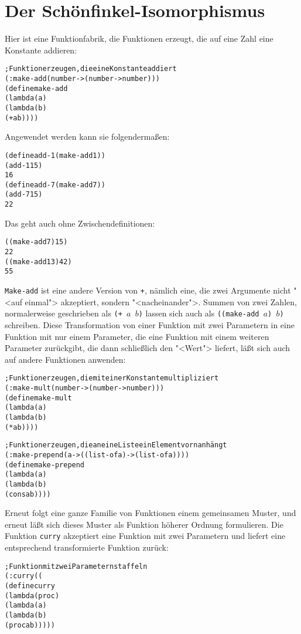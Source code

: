 \section{Der Schönfinkel-Isomorphismus}
\label{sec:currying}
Hier ist eine Funktionfabrik, die Funktionen erzeugt, die auf eine
Zahl eine Konstante addieren:
%
\begin{alltt}
; Funktion erzeugen, die eine Konstante addiert
(: make-add (number -> (number -> number)))
(define make-add
  (lambda (a)
    (lambda (b)
      (+ a b))))
\end{alltt}
%
Angewendet werden kann sie folgendermaßen:
%
\begin{alltt}
(define add-1 (make-add 1))
(add-1 15)
\evalsto{} 16
(define add-7 (make-add 7))
(add-7 15)
\evalsto{} 22
\end{alltt}
%
Das geht auch ohne Zwischendefinitionen:
%
\begin{alltt}
((make-add 7) 15)
\evalsto{} 22
((make-add 13) 42)
\evalsto{} 55
\end{alltt}
%
\texttt{Make-add} ist eine andere Version von \texttt{+}, nämlich
eine, die zwei Argumente nicht "<auf einmal"> akzeptiert, sondern
"<nacheinander">.  Summen von zwei Zahlen, normalerweise geschrieben
als \texttt{(+ $a$ $b$)} lassen sich auch als \texttt{((make-add $a$)
  $b$)} schreiben.  Diese Transformation von einer Funktion mit zwei
Parametern in eine Funktion mit nur einem Parameter, die eine Funktion
mit einem weiteren Parameter zurückgibt, die dann schließlich den "<Wert">
liefert, läßt sich auch auf andere Funktionen anwenden:
%
\begin{alltt}
; Funktion erzeugen, die mit einer Konstante multipliziert
(: make-mult (number -> (number -> number)))
(define make-mult
  (lambda (a)
    (lambda (b)
      (* a b))))

; Funktion erzeugen, die an eine Liste ein Element vorn anhängt
(: make-prepend (a -> ((list-of a) -> (list-of a))))
(define make-prepend
  (lambda (a)
    (lambda (b)
      (cons a b))))
\end{alltt}
%
Erneut folgt eine ganze Familie von Funktionen einem gemeinsamen
Muster, und erneut läßt sich dieses Muster als Funktion höherer
Ordnung formulieren.  Die Funktion \texttt{curry} akzeptiert
eine Funktion mit zwei Parametern und liefert eine entsprechend
transformierte Funktion zurück:
%
\begin{alltt}
; Funktion mit zwei Parametern staffeln
(: curry ((%a %b -> %c) -> (%a -> (%b -> %c))))
(define curry
  (lambda (proc)
    (lambda (a)
      (lambda (b)
        (proc a b)))))
\end{alltt}
